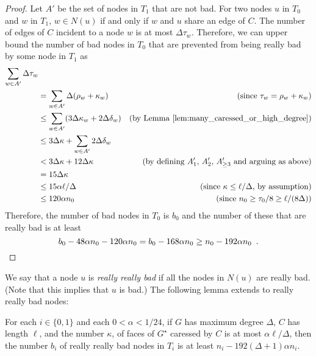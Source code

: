 \documentclass{patmorin}
\newcommand{\dual}[1]{{#1}^\star}
\begin{document}
\begin{proof}
  Let $A'$ be the set of nodes in $T_1$ that are not bad.  For two
  nodes $u$ in $T_0$ and $w$ in $T_1$,  $w\in N(u)$ if and only if $w$
  and $u$ share an edge of $C$.  The number of edges of $C$ incident to a node $w$ is at most $\Delta\tau_w$.  Therefore, we can upper bound the number of bad nodes in $T_0$ that are prevented from being really bad by some node in $T_1$ as
  \begin{align*}
   \sum_{w\in A'}\Delta \tau_w \\
    & = \sum_{w\in A'}\Delta (\rho_w+\kappa_w)
    & \text{(since $\tau_w=\rho_w+\kappa_w$)} \\
    & \le  \sum_{w\in A'}(3\Delta\kappa_w + 2\Delta\delta_w) & \text{(by \lemref{many_caressed_or_high_degree})} \\
    & \le  3\Delta\kappa + \sum_{w\in A'}2\Delta\delta_w \\
    & < 3\Delta\kappa + 12\Delta\kappa & \text{(by defining $A'_1$, $A'_2$, $A'_{\ge 3}$ and arguing as above)}\\
    & = 15\Delta\kappa \\
    & \le 15\alpha\ell/\Delta & \text{(since $\kappa\le\ell/\Delta$, by assumption)} \\
    & \le 120\alpha n_0 & \text{(since $n_0\ge \tau_0/8\ge \ell/(8\Delta)$)}
  \end{align*}
  Therefore, the number of bad nodes in $T_0$ is $b_0$ and the number of these that are really bad is at least
  \[
     b_0 - 48\alpha n_0 - 120\alpha n_0 =
     b_0 - 168\alpha n_0 \ge
     n_0 - 192\alpha n_0 \enspace . \qedhere
  \]
\end{proof}

We say that a node $u$ is \emph{really really bad} if all the nodes in $N(u)$ are really bad.  (Note that this implies that $u$ is bad.)  The following lemma extends  to really really bad nodes:

\begin{lem}
  For each $i\in\{0,1\}$ and each $0<\alpha < 1/24$,
  if $G$ has maximum degree $\Delta$, $C$ has length $\ell$, and the number
  $\kappa$, of faces of $\dual{G}$ caressed by $C$ is at most $\alpha\ell/\Delta$, then the number $b_i$ of really really bad nodes in $T_i$ is at least $n_i - 192(\Delta+1)\alpha n_i$.
\end{lem}
\end{document}
